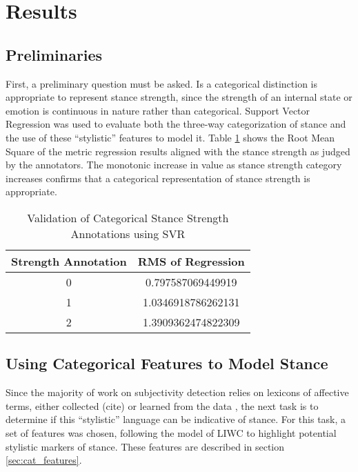 \section{Results} 

\subsection{Preliminaries} 

First, a preliminary question must be asked.  Is a categorical distinction is appropriate to represent stance strength, since the strength of an internal state or emotion is continuous in nature rather than categorical.  
Support Vector Regression was used to evaluate both the three-way categorization of stance and the use of these ``stylistic'' features to model it.  Table \ref{tab:svr_regression} shows the Root Mean Square of the metric regression results aligned with the stance strength as judged by the annotators.  The monotonic increase in value as stance strength category increases confirms that a categorical representation of stance strength is appropriate.  

\begin{table}[h]
\centering
	\begin{tabular}{c | c} 
		\textbf{Strength Annotation} & \textbf{RMS of Regression} \\ 
		\hline
		0               & \num{0.797587069449919} \\
		1               & \num{1.0346918786262131} \\
		2               & \num{1.3909362474822309} \\ 
	\end{tabular}
	\caption{Validation of Categorical Stance Strength Annotations using SVR} 
	\label{tab:svr_regression}
\end{table}

\subsection{Using Categorical Features to Model Stance} 

Since the majority of work on subjectivity detection relies on lexicons of affective terms, either collected (cite) or learned from the data \citep{wiebe2004learning}, the next task is to determine if this ``stylistic'' language can be indicative of stance.  For this task, a set of features was chosen, following the model of LIWC \citep{pennebaker2001linguistic} to highlight potential stylistic markers of stance.  These features are described in section \ref{sec:cat_features}.  

